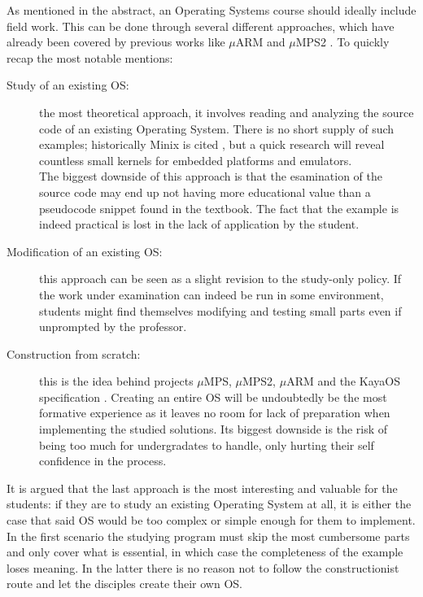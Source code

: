 \documentclass[12pt,a4paper,openright,twoside]{report}
\begin{document}
As mentioned in the abstract, an Operating Systems course should ideally include
field work. This can be done through several different approaches, which
have already been covered by previous works like $\mu$ARM and $\mu$MPS2
\cite{tesijonjic} \cite{tesimelletti}.
To quickly recap the most notable mentions:
\begin{description}
    \item[Study of an existing OS:] the most theoretical approach, it involves
        reading and analyzing the source code of an existing Operating System. There is no short supply of such
        examples; historically Minix is cited \cite{minix}, but a quick research
        will reveal countless small kernels for embedded platforms and emulators.\\
        The biggest downside of this approach is that the esamination of the source
        code may end up not having more educational value than a pseudocode snippet
        found in the textbook. The fact that the example is indeed practical is 
        lost in the lack of application by the student.
    \item[Modification of an existing OS:] this approach can be seen as a slight
        revision to the study-only policy. If the work under examination can indeed
        be run in some environment, students might find themselves modifying 
        and testing small parts even if unprompted by the professor.
    \item[Construction from scratch:] this is the idea behind projects $\mu$MPS, 
        $\mu$MPS2, $\mu$ARM and the KayaOS specification \cite{davolimorsiani}.
        Creating an entire OS will be undoubtedly be the most formative experience
        as it leaves no room for lack of preparation when implementing the
        studied solutions. Its biggest downside is the risk of being too much
        for undergradates to handle, only hurting their self confidence in the
        process.
\end{description}

It is argued that the last approach is the most interesting and valuable for 
the students: if they are to study an existing Operating System at all, it is
either the case that said OS would be too complex or simple enough for them 
to implement. In the first scenario the studying program must skip the most cumbersome
parts and only cover what is essential, in which case the completeness 
of the example loses meaning. In the latter there is no reason not to follow 
the constructionist route and let the disciples create their own OS.
\end{document}
